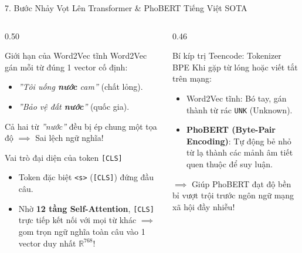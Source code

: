 \documentclass[aspectratio=169, 10pt]{beamer}
\begin{document}
\begin{frame}{7. Bước Nhảy Vọt Lên Transformer \& PhoBERT Tiếng Việt SOTA}
  \begin{columns}[T, onlytextwidth]
    \begin{column}{0.50\textwidth}
      \begin{block}{Giới hạn của Word2Vec tĩnh}
        \fontsize{7.5}{9.5}\selectfont
        Word2Vec gán mỗi từ đúng 1 vector cố định:
        \begin{itemize}\setlength{\itemsep}{0.1em}
          \item \textit{''Tôi uống \textbf{nước} cam''} (chất lỏng).
          \item \textit{''Bảo vệ đất \textbf{nước}''} (quốc gia).
        \end{itemize}
        Cả hai từ \textit{''nước''} đều bị ép chung một tọa độ $\implies$ Sai lệch ngữ nghĩa!
      \end{block}
      \vspace{0.15cm}
      \begin{exampleblock}{Vai trò đại diện của token \texttt{[CLS]}}
        \fontsize{7.5}{9.5}\selectfont
        \begin{itemize}\setlength{\itemsep}{0.1em}
          \item Token đặc biệt \texttt{<s>} (\texttt{[CLS]}) đứng đầu câu.
          \item Nhờ \textbf{12 tầng Self-Attention}, \texttt{[CLS]} trực tiếp kết nối với mọi từ khác $\implies$ gom trọn ngữ nghĩa toàn câu vào 1 vector duy nhất $\mathbb{R}^{768}$!
        \end{itemize}
      \end{exampleblock}
    \end{column}
    \hfill
    \begin{column}{0.46\textwidth}
      \begin{alertblock}{Bí kíp trị Teencode: Tokenizer BPE}
        \fontsize{7.5}{9.5}\selectfont
        Khi gặp từ lóng hoặc viết tắt trên mạng:
        \begin{itemize}\setlength{\itemsep}{0.15em}
          \item Word2Vec tĩnh: Bó tay, gán thành từ rác \texttt{UNK} (Unknown).
          \item \textbf{PhoBERT (Byte-Pair Encoding)}: Tự động bẻ nhỏ từ lạ thành các mảnh âm tiết quen thuộc để suy luận.
        \end{itemize}
        $\implies$ Giúp PhoBERT đạt độ bền bỉ vượt trội trước ngôn ngữ mạng xã hội đầy nhiễu!
      \end{alertblock}
    \end{column}
  \end{columns}
\end{frame}
\end{document}
